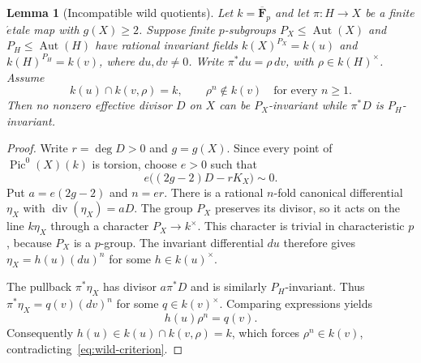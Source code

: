 \documentclass[11pt,a4paper,reqno]{amsart}
\newtheorem{lemma}[theorem]{Lemma}
\newcommand{\FF}{\mathbf F}
\newcommand{\Aut}{\operatorname{Aut}}
\newcommand{\Div}{\operatorname{div}}
\newcommand{\Pic}{\operatorname{Pic}}
\begin{document}
\begin{lemma}[Incompatible wild quotients]\label{lem:wild-obstruction}
Let $k=\overline{\FF}_p$ and let $\pi:H\to X$ be a finite
\(\acute{e}\)tale map with $g(X)\ge2$. Suppose finite $p$-subgroups
$P_X\le\Aut(X)$ and $P_H\le\Aut(H)$ have rational invariant
fields $k(X)^{P_X}=k(u)$ and $k(H)^{P_H}=k(v)$, where
$du,dv\ne0$. Write $\pi^*du=\rho\,dv$, with $\rho\in k(H)^\times$.
Assume
\begin{equation}\label{eq:wild-criterion}
 k(u)\cap k(v,\rho)=k,
 \qquad \rho^n\notin k(v)\quad\text{for every }n\ge1.
\end{equation}
Then no nonzero effective divisor $D$ on $X$ can be
$P_X$-invariant while $\pi^*D$ is $P_H$-invariant.
\end{lemma}
\begin{proof}
Write $r=\deg D>0$ and $g=g(X)$.  Since every point of
$\Pic^0(X)(k)$ is torsion, choose $e>0$ such that
\[
 e\bigl((2g-2)D-rK_X\bigr)\sim0.
\]
Put $a=e(2g-2)$ and $n=er$. There is a rational
$n$-fold canonical differential $\eta_X$ with
$\Div(\eta_X)=aD$. The group $P_X$ preserves its divisor,
so it acts on the line $k\eta_X$ through a character
$P_X\to k^\times$. This character is trivial in characteristic
$p$, because $P_X$ is a $p$-group. The invariant differential
$du$ therefore gives
$\eta_X=h(u)(du)^n$ for some $h\in k(u)^\times$.

The pullback $\pi^*\eta_X$ has divisor $a\pi^*D$ and is
similarly $P_H$-invariant. Thus
$\pi^*\eta_X=q(v)(dv)^n$ for some $q\in k(v)^\times$.
Comparing expressions yields
\[
          h(u)\rho^n=q(v).
\]
Consequently $h(u)\in k(u)\cap k(v,\rho)=k$, which forces
$\rho^n\in k(v)$, contradicting~\eqref{eq:wild-criterion}.
\end{proof}
\end{document}
